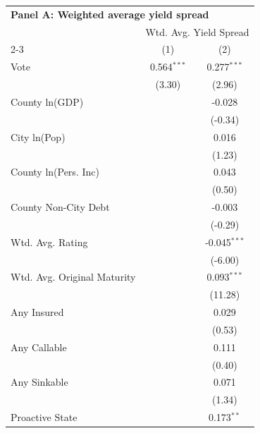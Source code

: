 \begingroup
\centering
\begin{tabular*}{\textwidth}{@{\extracolsep{\fill}}lcc}
\multicolumn{3}{l}{\textbf{Panel A: Weighted average yield spread}}\\

\addlinespace
   \toprule
    & \multicolumn{2}{c}{Wtd. Avg. Yield Spread}\\
   \cmidrule(lr){2-3}
                               & (1)           & (2)\\  
   \midrule 
   Vote                        & 0.564$^{***}$ & 0.277$^{***}$\\   
                               & (3.30)       & (2.96)\\   
   County ln(GDP)              &               & -0.028\\   
                               &               & (-0.34)\\   
   City ln(Pop)                &               & 0.016\\   
                               &               & (1.23)\\   
   County ln(Pers. Inc)        &               & 0.043\\   
                               &               & (0.50)\\   
   County Non-City Debt        &               & -0.003\\   
                               &               & (-0.29)\\   
   Wtd. Avg. Rating            &               & -0.045$^{***}$\\   
                               &               & (-6.00)\\   
   Wtd. Avg. Original Maturity &               & 0.093$^{***}$\\   
                               &               & (11.28)\\   
   Any Insured                 &               & 0.029\\   
                               &               & (0.53)\\   
   Any Callable                &               & 0.111\\   
                               &               & (0.40)\\   
   Any Sinkable                &               & 0.071\\   
                               &               & (1.34)\\   
   Proactive State             &               & 0.173$^{**}$\\   

\end{tabular*}
